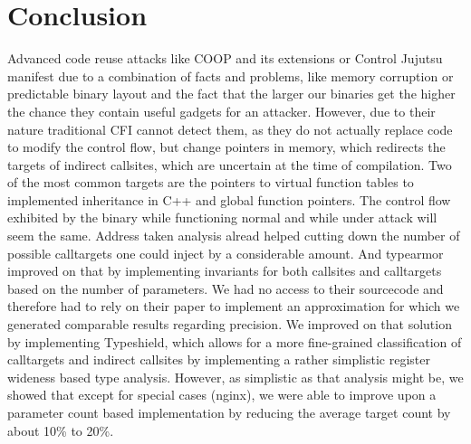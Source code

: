\chapter{Conclusion}
\label{chapter:Conclusion}
Advanced code reuse attacks like COOP and its extensions or Control Jujutsu manifest due to a combination of facts and problems, like memory corruption or predictable binary layout and the fact that the larger our binaries get the higher the chance they contain useful gadgets for an attacker. However, due to their nature traditional CFI cannot detect them, as they do not actually replace code to modify the control flow, but change pointers in memory, which redirects the targets of indirect callsites, which are uncertain at the time of compilation. Two of the most common targets are the pointers to virtual function tables to implemented inheritance in C++ and global function pointers. The control flow exhibited by the binary while functioning normal and while under attack will seem the same. Address taken analysis alread helped cutting down the number of possible calltargets one could inject by a considerable amount. And typearmor improved on that by implementing invariants for both callsites and calltargets based on the number of parameters. We had no access to their sourcecode and therefore had to rely on their paper to implement an approximation for which we generated comparable results regarding precision. We improved on that solution by implementing Typeshield, which allows for a more fine-grained classification of calltargets and indirect callsites by implementing a rather simplistic register wideness based type analysis. However, as simplistic as that analysis might be, we showed that except for special cases (nginx), we were able to improve upon a parameter count based implementation by reducing the average target count by about 10\% to 20\%.


